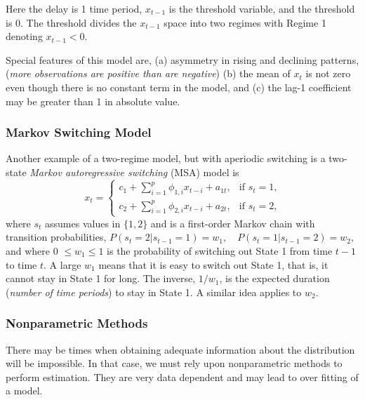 Here the delay is 1 time period, $x_{t-1}$ is the threshold variable, and 
the threshold is 0. The threshold divides the $x_{t-1}$ space into two 
regimes with Regime 1 denoting $x_{t-1} < 0$.

Special features of this model are,  (a) asymmetry in rising and declining 
patterns, (\textit{more observations are positive than are negative}) (b) the mean of $x_t$ is not zero even though there is no constant term in the model, and (c) the lag-1 coefficient may be greater than 1 in absolute value.

\subsubsection{Markov Switching Model}
Another example of a two-regime model, but with aperiodic switching is a two-state \emph{Markov autoregressive switching} (MSA) model is
\begin{equation}
x_t = 
\begin{cases}
c_1 + \sum^p_{i=1} \phi_{1,i} x_{t-i} + a_{1t}, &\text{if $s_t=1$,} \\
c_2 + \sum^p_{i=1} \phi_{2,i} x_{t-i} + a_{2t}, &\text{if $s_t=2$,}
\end{cases}
\end{equation} 
where $s_t$ assumes values in $\{1,2\}$ and is a first-order Markov chain 
with transition probabilities,
$P(s_t=2|s_{t-1}=1)=w_1, \quad P(s_t=1|s_{t-1}=2)=w_2,$
and where 0 $\le w_1 \le 1$ is the probability of switching out State 1 from 
time $t-1$ to time $t$. A large $w_1$ means that it is easy to switch out 
State 1, that is, it cannot stay in State 1 for long. The inverse, $1/w_1$, is 
the expected duration (\textit{number of time periods}) to stay in State 1. A similar idea applies to $w_2$. 



\subsubsection{Nonparametric Methods}
There may be times when obtaining adequate information about the distribution will be impossible. In that case, we must rely upon nonparametric methods to perform estimation. They are very data dependent and may lead to over fitting of a model.

